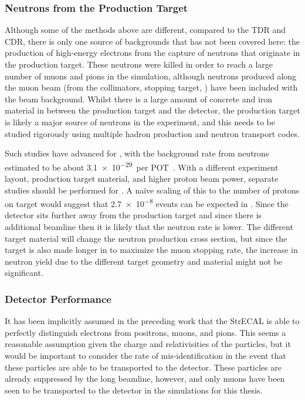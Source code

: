 \subsubsection*{Neutrons from the Production Target}
Although some of the methods above are different, compared to the \phaseI TDR and \phaseII CDR, there is only one source of backgrounds that has not been covered here:
the production of high-energy electrons from the capture of neutrons that originate in the production target.
These neutrons were killed in order to reach a large number of muons and pions in the simulation, although neutrons produced along the muon beam (from the collimators, stopping target, \etc) have been included with the beam background.
Whilst there is a large amount of concrete and iron material in between the production target and the detector, the production target is likely a major source of neutrons in the experiment, and this needs to be studied rigorously using multiple hadron production and neutron transport codes.

Such studies have advanced for \phaseI, with the background rate from neutrons estimated to be about \num{3.1e-29}~per \ac{POT}~\cite{TDR2016}.
With a different experiment layout, production target material, and higher proton beam power, separate studies should be performed  for \phaseII.
A na\"{i}ve scaling of this to the \phaseII number of protons on target would suggest that \num{2.7e-8} events can be expected in \phaseII.
Since the detector sits further away from the production target and since there is additional beamline then it is likely that the neutron rate is lower.
The different target material will change the neutron production cross section, but since the target is also made longer in \phaseI to maximize the muon stopping rate, the increase in neutron yield due to the different target geometry and material might not be significant.

\subsubsection*{Detector Performance}
It has been implicitly assumed in the preceding work that the StrECAL is able to perfectly distinguish electrons from positrons, muons, and pions.
This seems a reasonable assumption given the charge and relativisities of the particles, but it would be important to consider the rate of mis-identification in the event that these particles are able to be transported to the detector.
These particles are already suppressed by the long beamline, however, and only muons have been seen to be transported to the detector in the simulations for this thesis.

